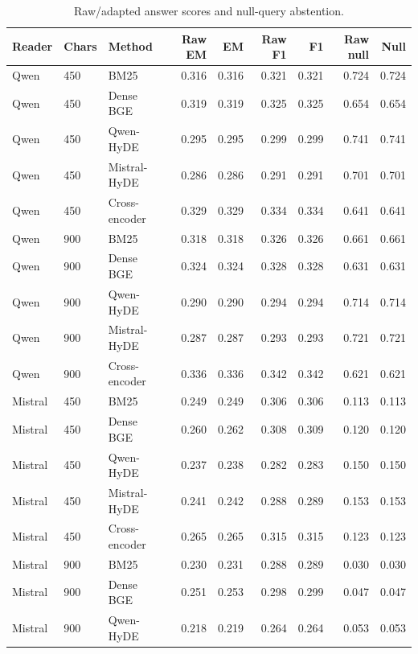 \begin{table}[!htbp]
\centering\footnotesize
\caption{Raw/adapted answer scores and null-query abstention.}
\label{tab:mhrag_raw_null}
\begin{threeparttable}
\setlength{\tabcolsep}{3pt}
\begin{tabular}{lllrrrrrr}
\toprule
Reader & Chars & Method & Raw EM & EM & Raw F1 & F1 & Raw null & Null \\
\midrule
Qwen & 450 & BM25 & 0.316 & 0.316 & 0.321 & 0.321 & 0.724 & 0.724 \\
Qwen & 450 & Dense BGE & 0.319 & 0.319 & 0.325 & 0.325 & 0.654 & 0.654 \\
Qwen & 450 & Qwen-HyDE & 0.295 & 0.295 & 0.299 & 0.299 & 0.741 & 0.741 \\
Qwen & 450 & Mistral-HyDE & 0.286 & 0.286 & 0.291 & 0.291 & 0.701 & 0.701 \\
Qwen & 450 & Cross-encoder & 0.329 & 0.329 & 0.334 & 0.334 & 0.641 & 0.641 \\
Qwen & 900 & BM25 & 0.318 & 0.318 & 0.326 & 0.326 & 0.661 & 0.661 \\
Qwen & 900 & Dense BGE & 0.324 & 0.324 & 0.328 & 0.328 & 0.631 & 0.631 \\
Qwen & 900 & Qwen-HyDE & 0.290 & 0.290 & 0.294 & 0.294 & 0.714 & 0.714 \\
Qwen & 900 & Mistral-HyDE & 0.287 & 0.287 & 0.293 & 0.293 & 0.721 & 0.721 \\
Qwen & 900 & Cross-encoder & 0.336 & 0.336 & 0.342 & 0.342 & 0.621 & 0.621 \\
Mistral & 450 & BM25 & 0.249 & 0.249 & 0.306 & 0.306 & 0.113 & 0.113 \\
Mistral & 450 & Dense BGE & 0.260 & 0.262 & 0.308 & 0.309 & 0.120 & 0.120 \\
Mistral & 450 & Qwen-HyDE & 0.237 & 0.238 & 0.282 & 0.283 & 0.150 & 0.150 \\
Mistral & 450 & Mistral-HyDE & 0.241 & 0.242 & 0.288 & 0.289 & 0.153 & 0.153 \\
Mistral & 450 & Cross-encoder & 0.265 & 0.265 & 0.315 & 0.315 & 0.123 & 0.123 \\
Mistral & 900 & BM25 & 0.230 & 0.231 & 0.288 & 0.289 & 0.030 & 0.030 \\
Mistral & 900 & Dense BGE & 0.251 & 0.253 & 0.298 & 0.299 & 0.047 & 0.047 \\
Mistral & 900 & Qwen-HyDE & 0.218 & 0.219 & 0.264 & 0.264 & 0.053 & 0.053 \\

\end{tabular}
\end{threeparttable}
\end{table}
